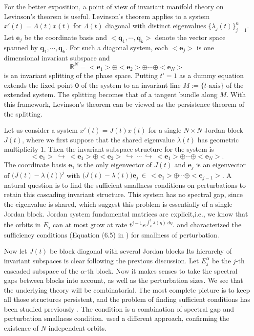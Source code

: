 \documentclass[a4paper,11pt]{article}
\newcounter{Theorem}
\theoremstyle{remark}
\begin{document}
For the better exposition, a point of view of invariant manifold theory on Levinson's theorem is useful. Levinson's theorem applies to a system $x'(t) = \Lambda(t)x(t)$ for $\Lambda(t)$ diagonal with distinct eigenvalues $\{\lambda_j(t)\}_{j=1}^n$. Let $\mathbf{e}_j$ be the coordinate basis and $< \mathbf{q}_1, \cdots, \mathbf{q}_k>$ denote the vector space spanned by $\mathbf{q}_1 , \cdots, \mathbf{q}_k$. For such a diagonal system, each $< \mathbf{e}_j>$ is one dimensional invariant subspace and 
$$\mathbb{R}^N = < \mathbf{e}_1> \oplus < \mathbf{e}_2> \oplus \cdots \oplus < \mathbf{e}_N>$$
is an invariant splitting of the phase space. Putting $t'=1$ as a dummy equation extends the fixed point $ \mathbf{0}$ of the system to an invariant line $M:=\text{\{$t$-axis\}}$ of the extended system. The splitting becomes that of a tangent bundle along $M$. With this framework, Levinson's theorem can be viewed as the persistence theorem of the splitting.

Let us consider a system $x'(t)=J(t)x(t)$ for a single $N \times N$ Jordan block  $J(t)$, where we first suppose that the shared eigenvalue $\lambda(t)$ has geometric multiplicity $1$. Then the invariant subspace structure for the system is 
$$ < \mathbf{e}_1> ~\hookrightarrow~ < \mathbf{e}_1> \oplus < \mathbf{e}_2>~ \hookrightarrow~ \cdots ~\hookrightarrow~ < \mathbf{e}_1> \oplus \cdots \oplus < \mathbf{e}_N>.$$
The coordinate basis $\mathbf{e}_1$ is the only eigenvector of $J(t)$ and $\mathbf{e}_j$ is an eigenvector of $\Big(J(t)-\lambda(t)\Big)^j$ with $\Big(J(t)-\lambda(t)\Big)\mathbf{e}_j \,\in\, < \mathbf{e}_1> \oplus \cdots \oplus < \mathbf{e}_{j-1}>$. A natural question is to find the sufficient smallness conditions on perturbations to retain this cascading invariant structure. This system has no spectral gap, since the eigenvalue is shared, which suggest this problem is essentially of a single Jordan block. Jordan system fundamental matrices are explicit,i.e., we know that the orbits in $E_j$ can at most grow at rate $t^{j-1}e^{\int_a^t \lambda(\eta)\;d\eta}$. \cite{C65} and \cite{E89} characterized the sufficiency conditions (Equation (6.5) in \cite[p.210]{BL15}) for smallness of perturbation.

Now let $J(t)$ be block diagonal with several Jordan blocks Its hierarchy of invariant subspaces is clear following the previous discussion. Let $E^\alpha_j$ be the $j$-th cascaded subspace of the $\alpha$-th block. Now it makes senses to take the spectral gaps between blocks into account, as well as the perturbation sizes. We see that the underlying theory will be combinatorial. The most complete picture is to keep all those structures persistent, and the problem of finding sufficient conditions has been studied previously \cite[Theorem 6.6, Equation (6.29)]{BL15}. The condition is a combination of spectral gap and perturbation smallness condition. \cite{BL15} used a different approach, confirming the existence of $N$ independent orbits.
\end{document}
